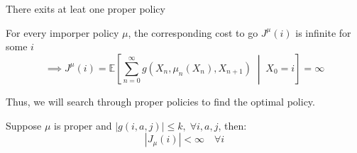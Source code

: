 \begin{assumption}
    There exits at leat one proper policy
\end{assumption}
\begin{assumption}
    For every imporper policy \(\mu \), the corresponding cost to go \(J^{\mu} (i)\) is infinite for some \(i\)
    \[
        \implies J^{\mu} (i) = \mathbb{E} \left[ 
        \sum_{n=0}^{\infty} g(X_n,\mu _n(X_n),X_{n+1}) \;\middle|\; X_0 = i
         \right]  = \infty 
    \]
\end{assumption}
Thus, we will search through proper policies to find the optimal policy.

\begin{lemma}
    Suppose \(\mu \) is proper and \(\left\vert g(i,a,j) \right\vert \leq  k, \; \forall i,a,j\), then:
    \[
        \left\vert J_\mu (i) \right\vert < \infty \quad \forall i
    \]
\end{lemma}
